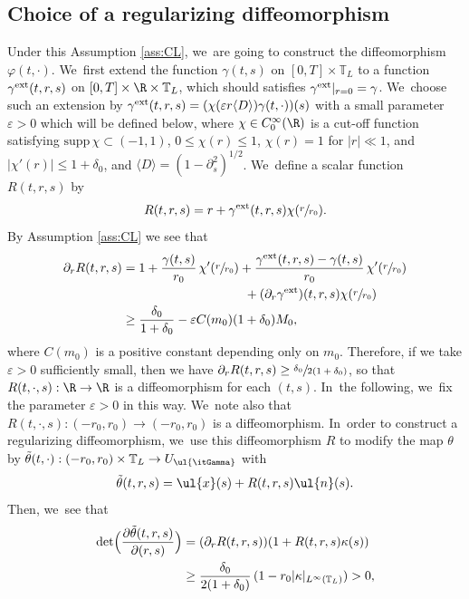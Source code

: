 \subsection{Choice of a regularizing diffeomorphism}\label{subsect:ChoiceD}
Under this Assumption \ref{ass:CL}, we~are going to construct the diffeomorphism $\varphi(t,\cdot)$. We~first extend the function $\gamma(t,s)$ on $[0,T]\times\mathbb{T}_L$ to a function $\gamma^{\rm ext}(t,r,s)$ on $[0,T]\times\R\times\mathbb{T}_L$,
which should satisfies $\gamma^{\rm ext}|_{r=0}=\gamma$. We~choose such an extension by $\gamma^{\rm ext}(t,r,s)=(\chi(\varepsilon r\langle D\rangle)\gamma(t,\cdot))(s)$ with a small parameter $\varepsilon>0$
which will be defined below, where $\chi \in C_0^\infty(\R)$ is a cut-off function satisfying $\mbox{supp}\,\chi \subset (-1,1)$,
$0\leq \chi(r)\leq 1$, $\chi(r)=1$ for $|r|\ll1$, and $|\chi'(r)| \leq 1+\delta_0$, and $\langle D\rangle=(1-\partial_s^2)^{1/2}$. We~define a scalar function $R(t,r,s)$ by
\[
R(t,r,s) = r + \gamma^{\rm ext}(t,r,s)\chi(\sfrac{r}{r_0}).
\]
By Assumption \ref{ass:CL} we see that
\begin{align*}
\partial_r R(t,r,s)
&= 1 + \frac{\gamma(t,s)}{r_0}\,\chi'(\sfrac{r}{r_0}) + \frac{\gamma^{\rm ext}(t,r,s)-\gamma(t,s)}{r_0}\,\chi'(\sfrac{r}{r_0})\\
&\hspace*{3.4cm}+ (\partial_r\gamma^{\rm ext})(t,r,s)\chi(\sfrac{r}{r_0}) \\
&\geq \frac{\delta_0}{1+\delta_0} - \varepsilon C(m_0)(1+\delta_0)M_0,
\end{align*}
where $C(m_0)$ is a positive constant depending only on $m_0$.
Therefore, if we take $\varepsilon>0$ sufficiently small, then we have $\partial_r R(t,r,s) \geq \sfrac{\delta_0}{2(1+\delta_0)}$,
so that $R(t,\cdot,s): \R\to\R$ is a diffeomorphism for each $(t,s)$. In~the following, we~fix the parameter $\varepsilon>0$ in this way. We~note also that $R(t,\cdot,s): (-r_0,r_0) \to (-r_0,r_0)$ is a diffeomorphism. In~order to construct a regularizing diffeomorphism, we~use this diffeomorphism $R$ to modify the map $\theta$ by
$\tilde{\theta}(t,\cdot): (-r_0,r_0)\times\mathbb{T}_L \to U_{\ul{\itGamma}}$ with
\begin{equation}\label{theta-modify}
\tilde{\theta}(t,r,s) = \ul{x}(s) + R(t,r,s)\ul{n}(s).
\end{equation}
Then, we~see that
\begin{align*}
\det\Bigl(\frac{\partial\tilde{\theta}(t,r,s)}{\partial(r,s)} \Bigr)
&= (\partial_rR(t,r,s))(1+R(t,r,s)\kappa(s)) \\
&\geq \frac{\delta_0}{2(1+\delta_0)}\,(1-r_0|\kappa|_{L^\infty(\mathbb{T}_L)})>0,
\end{align*}

